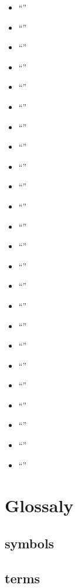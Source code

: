 \documentclass[pdflatex,sn-mathphys-num]{sn-jnl}%
\theoremstyle{thmstyleone}%
\theoremstyle{thmstyletwo}%
\theoremstyle{thmstylethree}%
\newcommand{\pname}[1]{``{\uline{\sl {#1}}}''}
\begin{document}
\begin{enumerate}
\begin{itemize}
			\item \pname{}\cite{}
			\item \pname{}\cite{}
			\item \pname{}\cite{}
			\item \pname{}\cite{}
			\item \pname{}\cite{}
			\item \pname{}\cite{}
			\item \pname{}\cite{}
			\item \pname{}\cite{}
			\item \pname{}\cite{}
			\item \pname{}\cite{}
			\item \pname{}\cite{}
			\item \pname{}\cite{}
			\item \pname{}\cite{}
			\item \pname{}\cite{}
			\item \pname{}\cite{}
			\item \pname{}\cite{}
			\item \pname{}\cite{}
			\item \pname{}\cite{}
			\item \pname{}\cite{}
			\item \pname{}\cite{}
			\item \pname{}\cite{}
			\item \pname{}\cite{}
			\item \pname{}\cite{}
			\item \pname{}\cite{}
		\end{itemize}
	
\end{enumerate}


\section{Glossaly}\label{ap1}
\subsection{symbols}

\subsection{terms}
\printglossary[nonumberlist, title={\hspace{-30pt}}, style=altlist]

\appendix

\end{document}
